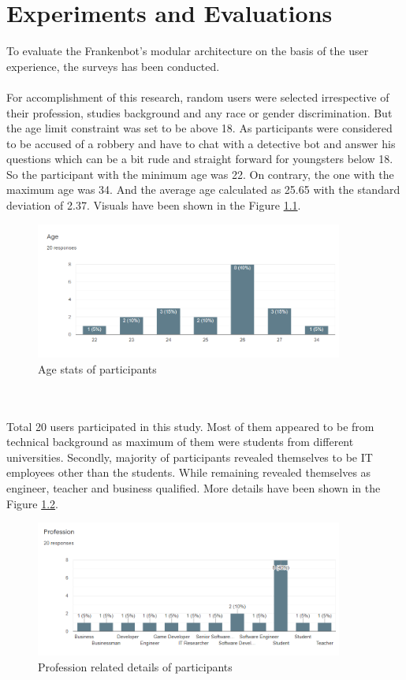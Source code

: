 \chapter{Experiments and Evaluations\label{cha:chapter4}}

To evaluate the Frankenbot's modular architecture on the basis of the user experience, the surveys has been conducted. 
\\~\\
For accomplishment of this research, random users were selected irrespective of their profession, studies background and any race or gender discrimination. But the age limit constraint was set to be above 18. As participants were considered to be accused of a robbery and have to chat with a detective bot and answer his questions which can be a bit rude and straight forward for youngsters below 18. So the participant with the minimum age was 22. On contrary, the one with the maximum age was 34. And the average age calculated as 25.65 with the standard deviation of 2.37. Visuals have been shown in the Figure \ref{fig:ageGraph}.

\begin{figure}[!h]
    \centering
    \includegraphics[width=0.9\textwidth]{img/Age_Graph.PNG}
    \caption{Age stats of participants}
    \label{fig:ageGraph}
\end{figure}
\\~\\
Total 20 users participated in this study. Most of them appeared to be from technical background as maximum of them were students from different universities. Secondly, majority of participants revealed themselves to be IT employees other than the students. While remaining revealed themselves as engineer, teacher and business qualified. More details have been shown in the Figure \ref{fig:profGraph}.

\begin{figure}[!h]
    \centering
    \includegraphics[width=0.9\textwidth]{img/Profession_Graph.PNG}
    \caption{Profession related details of participants}
    \label{fig:profGraph}
\end{figure}

